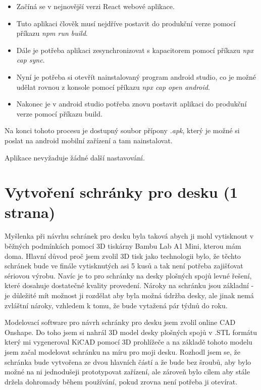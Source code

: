 \begin{itemize}
    \item Začíná se v nejnovější verzi React webové aplikace.
    \item Tuto aplikaci člověk musí nejdříve postavit do produkční verze pomocí příkazu \textit{npm run build}.
    \item Dále je potřeba aplikaci zesynchronizovat s kapacitorem pomocí příkazu \textit{npx cap sync}.
    \item Nyní je potřeba si otevřít nainstalovaný program android studio, co je možné udělat rovnou z konsole pomocí příkazu \textit{npx cap open android}.
    \item Nakonec je v android studio potřeba znovu postavit aplikaci do produkční verze pomocí příkazu build.
\end{itemize}

Na konci tohoto procesu je dostupný soubor přípony \textit{.apk}, který je možné si poslat na android mobilní zařízení a tam nainstalovat.

Aplikace nevyžaduje žádné další nastavování.

\section{Vytvoření schránky pro desku (1 strana)}

Myšlenka při návrhu schránek pro desku byla taková abych ji mohl vytisknout v běžných podmínkách pomocí 3D tiskárny Bambu Lab A1 Mini, kterou mám doma. Hlavní důvod proč jsem zvolil 3D tisk jako technologii bylo, že těchto schránek bude ve finále vytisknutých asi 5 kusů a tak není potřeba zajišťovat sériovou výrobu. Navíc je to pro schránky na desky plošných spojů levné řešení, které dosahuje dostatečné kvality provedení. Nároky na schránku jsou základní - je důležité mít možnost ji rozdělat aby byla možná údržba desky, ale jinak nemá zvláštní nároky, vzhledem k tomu, že bude vytažená pár týdnů do roku.

Modelovací software pro návrh schránky pro desku jsem zvolil online CAD Onshape. Do toho jsem si nahrál 3D model desky plošných spojů v .STL formátu který mi vygeneroval KiCAD pomocí 3D prohlížeče a na základě tohoto modelu jsem začal modelovat schránku na míru pro moji desku. Rozhodl jsem se, že schránka bude vytvořena ze dvou hlavních částí a že bude bez šroubů, aby bylo možné na ni jednodušeji prototypovat zařízení, ale zároveň bylo cílem aby stále držela dohromady během používání, pokud zrovna není potřeba ji otevírat. 

